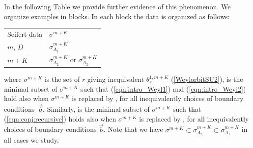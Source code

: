 \documentclass[pdftex]{sigma}
\def\bv{{\vec{\underline{b}}}}
\theoremstyle{definition}
\numberwithin{equation}{section}
\begin{document}
In the following Table we provide further evidence of this phenomenon. We organize examples in blocks. In each block the data is organized as follows:
\begin{table}[ht]\renewcommand{\arraystretch}{1.2}
 \centering
 \begin{tabular}{|ll|}\hline
 Seifert data & $\sigma^{m+K}$ \\
 $m$, $D$ & $\sigma_{A_{1}}^{m+K}$ \\
 $m+K$ & $\sigma_{A_{2}}^{m+K}$ or $\bar \sigma_{A_{2}}^{m+K}$\\\hline
 \end{tabular}
\end{table}
 where $\sigma^{m+K}$ is the set of $r$ giving
inequivalent $\theta^{1,m+K}_r$ (\ref{WeylorbitSU2}),  is the minimal subset of $\sigma^{m+K}$ such that
(\ref{eqn:intro_Weyl1}) and (\ref{eqn:intro_Weyl2}) hold also when $\sigma^{m+K}$ is replaced by , for all inequivalently choices of boundary conditions~$\bv$. Similarly,
  is the minimal subset of $\sigma^{m+K}$ such that
(\ref{eqn:conj:recursive}) holds also when $\sigma^{m+K}$ is replaced by , for all inequivalently choices of boundary conditions $\bv$. Note that we have $\sigma_{}^{m+K}\subset \sigma_{A_2}^{m+K}\subset \sigma_{A_1}^{m+K}$ in all cases we study.
\end{document}
